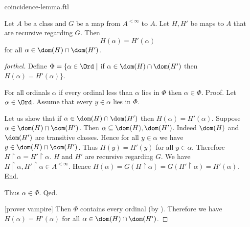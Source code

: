 \documentclass{naproche-library}
\begin{document}
\begin{smodule}[title=The Coincidence Lemma]{coincidence-lemma.ftl}
  
\begin{lemma}[forthel,title=Coincidence Lemma,id=transfinite-recursion_coincidence]
  Let $A$ be a class and $G$ be a map from $A^{< \infty}$ to $A$.
  Let $H, H'$ be maps to $A$ that are recursive regarding $G$.
  Then \[ H(\alpha) = H'(\alpha) \] for all $\alpha \in \dom(H) \cap \dom(H')$.
\end{lemma}
\begin{proof}[forthel]
  Define $\Phi = \{ \alpha \in \Ord \mid$ if
  $\alpha \in \dom(H) \cap \dom(H')$ then $H(\alpha) = H'(\alpha) \}$.

  For all ordinals $\alpha$ if every ordinal less than $\alpha$ lies in $\Phi$ then $\alpha \in \Phi$. \newline
  Proof.
    Let $\alpha \in \Ord$.
    Assume that every $y \in \alpha$ lies in $\Phi$.

    Let us show that if $\alpha \in \dom(H) \cap \dom(H')$ then
    $H(\alpha) = H'(\alpha)$.
      Suppose $\alpha \in \dom(H) \cap \dom(H')$.
      Then $\alpha \subseteq \dom(H), \dom(H')$.
      Indeed $\dom(H)$ and $\dom(H')$ are transitive classes.
      Hence for all $y \in \alpha$ we have $y \in \dom(H) \cap \dom(H')$.
      Thus $H(y) = H'(y)$ for all $y \in \alpha$.
      Therefore $H \restriction \alpha = H' \restriction \alpha$.
      $H$ and $H'$ are recursive regarding $G$.
      We have $H \restriction \alpha, H' \restriction \alpha \in A^{< \infty}$.
      Hence $H(\alpha)
        = G(H \restriction \alpha)
        = G(H' \restriction \alpha)
        = H'(\alpha)$.
    End.

    Thus $\alpha \in \Phi$.
  Qed.

  [prover vampire]
  Then $\Phi$ contains every ordinal (by ).
  Therefore we have $H(\alpha) = H'(\alpha)$ for all $\alpha \in \dom(H) \cap \dom(H')$.
\end{proof}
\end{smodule}
\end{document}
